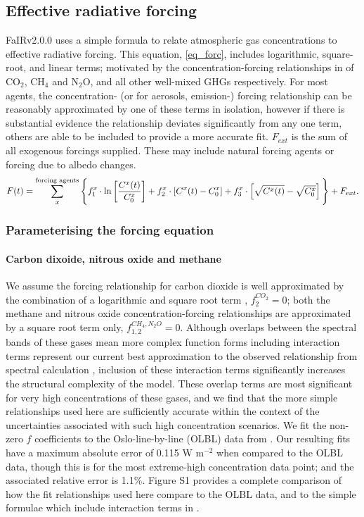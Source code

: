\documentclass[gmd, manuscript]{copernicus}
\begin{document}
\subsection{Effective radiative forcing} \label{forcing_relations}
FaIRv2.0.0 uses a simple formula to relate atmospheric gas concentrations to effective radiative forcing. This equation, \ref{eq_forc}, includes logarithmic, square-root, and linear terms; motivated by the concentration-forcing relationships in \cite{Myhre2013a} of CO$_2$, CH$_4$ and N$_2$O, and all other well-mixed GHGs respectively. For most agents, the concentration- (or for aerosols, emission-) forcing relationship can be reasonably approximated by one of these terms in isolation, however if there is substantial evidence the relationship deviates significantly from any one term, others are able to be included to provide a more accurate fit. $F_{ext}$ is the sum of all exogenous forcings supplied. These may include natural forcing agents or forcing due to albedo changes.
\begin{equation}
    F(t) = \sum_x^{\text{forcing agents}} \Bigg\{ f_1^x \cdot \text{ln}\left[\frac{C^x(t)}{C_0^x}\right] + f_2^x \cdot [C^x(t) - C_0^x] + f_3^x \cdot\left[\sqrt{C^x(t)} - \sqrt{C_0^x}\right] \Bigg\} + F_{ext}. \label{eq_forc}\\
\end{equation}
\subsubsection{Parameterising the forcing equation} \label{forcing_parameters}
\paragraph*{Carbon dixoide, nitrous oxide and methane}
We assume the forcing relationship for carbon dioxide is well approximated by the combination of a logarithmic and square root term \citep{Ramaswamy2001}, $f_2^{CO_2}=0$; both the methane and nitrous oxide concentration-forcing relationships are approximated by a square root term only, $f_{1,2}^{CH_4,N_2O}=0$. Although overlaps between the spectral bands of these gases mean more complex function forms including interaction terms represent our current best approximation to the observed relationship from spectral calculation \citep{Etminan2016}, inclusion of these interaction terms significantly increases the structural complexity of the model. These overlap terms are most significant for very high concentrations of these gases, and we find that the more simple relationships used here are sufficiently accurate within the context of the uncertainties associated with such high concentration scenarios. We fit the non-zero $f$ coefficients to the Oslo-line-by-line (OLBL) data from \cite{Etminan2016}. Our resulting fits have a maximum absolute error of 0.115 W m$^{-2}$ when compared to the OLBL data, though this is for the most extreme-high concentration data point; and the associated relative error is 1.1\%. Figure S1 provides a complete comparison of how the fit relationships used here compare to the OLBL data, and to the simple formulae which include interaction terms in \cite{Etminan2016}. 
\end{document}
